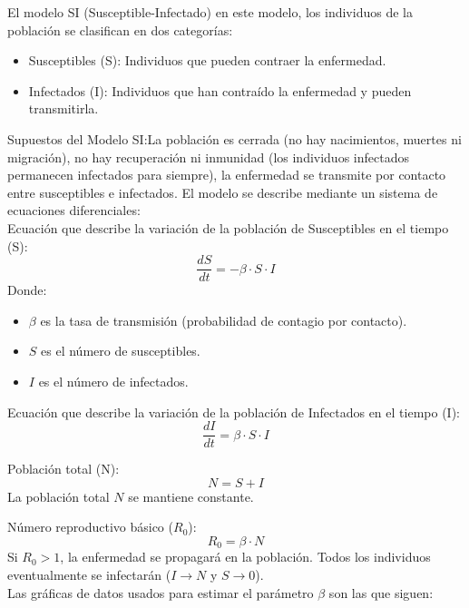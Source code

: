 El modelo SI (Susceptible-Infectado) en este modelo, los individuos de la población se clasifican en dos categorías:
\begin{itemize}
    \item Susceptibles (S): Individuos que pueden contraer la enfermedad.
    \item  Infectados (I): Individuos que han contraído la enfermedad y pueden transmitirla.    
\end{itemize}

Supuestos del Modelo SI:La población es cerrada (no hay nacimientos, muertes ni migración), no hay recuperación ni inmunidad (los individuos infectados permanecen 
infectados para siempre), la enfermedad se transmite por contacto entre susceptibles e infectados. El modelo se describe mediante un sistema de ecuaciones diferenciales: \\

Ecuación que describe la variación de la población de Susceptibles en el tiempo (S): \\
   \[
   \frac{dS}{dt} = -\beta \cdot S \cdot I
   \]
   Donde: \\
   \begin{itemize}
    \item \( \beta \) es la tasa de transmisión (probabilidad de contagio por contacto).
    \item \( S \) es el número de susceptibles.
    \item \( I \) es el número de infectados.
    \end{itemize}

   Ecuación que describe la variación de la población de Infectados en el tiempo (I):\\
   \[
   \frac{dI}{dt} = \beta \cdot S \cdot I
   \]

Población total (N): \\
   \[
   N = S + I
   \]
   La población total \( N \) se mantiene constante.

Número reproductivo básico (\( R_0 \)):
   \[
   R_0 = \beta \cdot N
   \]
   Si \( R_0 > 1 \), la enfermedad se propagará en la población. Todos los individuos eventualmente se infectarán (\( I \to N \) y \( S \to 0 \)). \\

   Las gráficas de datos usados para estimar el parámetro $\beta$ son las que siguen:




